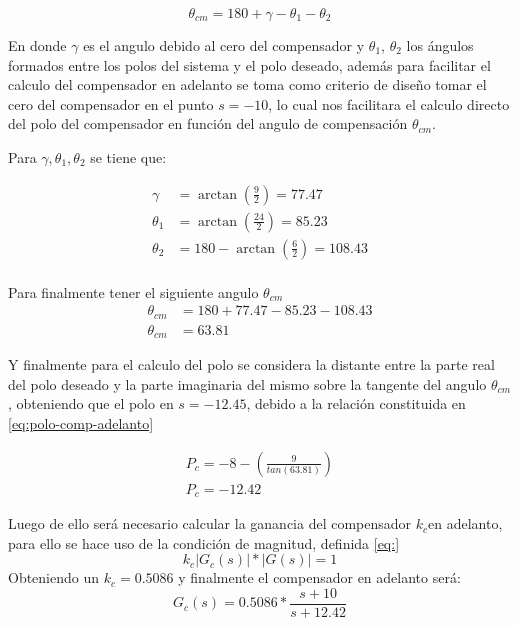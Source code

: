 \documentclass[conference]{IEEEtran}
\begin{document}
	\begin{equation}
		\theta_{cm} = 180 + \gamma - \theta_1 - \theta_2
		\label{eq:angulo-compensacion}
	\end{equation}
	
	En donde $\gamma$ es el angulo debido al cero del compensador y $\theta_1$, $\theta_2$ los ángulos formados entre los polos del sistema y el polo deseado, además para facilitar el calculo del compensador en adelanto se toma como criterio de diseño tomar el cero del compensador en el punto $s = -10$, lo cual nos facilitara el calculo directo del polo del compensador en función del angulo de compensación $\theta_{cm}$.
	
	Para $\gamma, \theta_1, \theta_2$ se tiene que:
	
	\begin{align}
		\gamma &= \arctan(\frac{9}{2}) = 77.47 \\
		\theta_1 &= \arctan(\frac{24}{2}) = 85.23 \\
		\theta_2 &= 180 - \arctan(\frac{6}{2}) = 108.43\\
	\end{align}
	
	Para finalmente tener el siguiente angulo $\theta_{cm}$
	\begin{align}
		\theta_{cm} &= 180 + 77.47 - 85.23 - 108.43 \\
		\theta_{cm} &= 63.81 \label{eq:angulo-compensacion-adelanto}
	\end{align}
	
	Y finalmente para el calculo del polo se considera la distante entre la parte real del polo deseado y la parte imaginaria del mismo sobre la tangente del angulo $\theta_{cm}$, obteniendo que el polo en $s = -12.45$, debido a la relación constituida en \ref{eq:polo-comp-adelanto}
	
	\begin{align}
		P_c = -8 -(\frac{9}{tan(63.81)})\\
		P_c = -12.42
		\label{eq:polo-comp-adelanto} 
	\end{align}
	
	Luego de ello será necesario calcular la ganancia del compensador $k_c$en adelanto, para ello se hace uso de la condición de magnitud, definida \ref{eq:}
	\begin{equation}
		k_c|G_c(s)|*|G(s)| = 1
		\label{eq:condicion-magnitud}
	\end{equation}
	Obteniendo un $k_c = 0.5086$ y finalmente el compensador en adelanto será: 
	\begin{equation}
		G_c(s) = 0.5086*\frac{s + 10}{s + 12.42}
	\end{equation}
	
\end{document}
